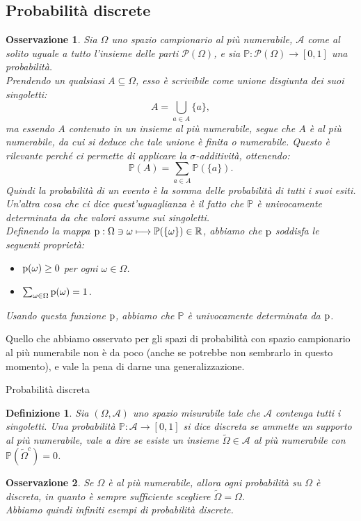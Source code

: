 \documentclass[11pt]{book}
\theoremstyle{Definizione}
\newtheorem*{mydef}{Definizione}
\theoremstyle{TeoremaProposizioneLemmaCorollario}
\theoremstyle{OsservazioneNota}
\newtheorem{myobs}{Osservazione}[section]
\newcommand{\R}{\mathbb{R}}
\newcommand{\parti}[1]{\mathcal{P}\left({#1}\right)}
\renewcommand{\P}{\mathbb{P}}
\newcommand{\p}{\textup{p}}
\begin{document}
\subsection{Probabilità discrete}
\begin{myobs}
Sia $\Omega$ uno spazio campionario al più numerabile, $\mathcal{A}$ come al solito uguale a tutto l'insieme delle parti $\parti{\Omega}$, e sia $\P:\parti{\Omega}\longrightarrow [0,1]$ una probabilità.\\
Prendendo un qualsiasi $A\subseteq \Omega$, esso è scrivibile come unione disgiunta dei suoi singoletti:
$$
A = \bigcup_{a \in A} \{a\},
$$
ma essendo $A$ contenuto in un insieme al più numerabile, segue che $A$ è al più numerabile, da cui si deduce che tale unione è finita o numerabile. Questo è rilevante perché ci permette di applicare la $\sigma$-additività, ottenendo:
$$
\P(A) = \sum_{a\in A} \P(\{a\}).
$$
Quindi la probabilità di un evento è la somma delle probabilità di tutti i suoi esiti.\\
Un'altra cosa che ci dice quest'uguaglianza è il fatto che $\P$ è univocamente determinata da che valori assume sui singoletti.\\
Definendo la mappa $\p:\Omega \ni \omega \longmapsto \P(\{\omega\}) \in \R$, abbiamo che $\p$ soddisfa le seguenti proprietà:
\begin{itemize}
\item[$(i)$] $\p(\omega) \geq 0$ per ogni $\omega\in \Omega$.
\item[$(ii)$] $\sum_{\omega\in \Omega} \p(\omega) = 1$.
\end{itemize}
Usando questa funzione $\p$, abbiamo che $\P$ è univocamente determinata da $\p$.
\end{myobs}
Quello che abbiamo osservato per gli spazi di probabilità con spazio campionario al più numerabile non è da poco (anche se potrebbe non sembrarlo in questo momento), e vale la pena di darne una generalizzazione.
\begin{boxdef}{Probabilità discreta}
\begin{mydef}
Sia $(\Omega,\mathcal{A})$ uno spazio misurabile tale che $\mathcal{A}$ contenga tutti i singoletti. Una probabilità $\P:\mathcal{A}\longrightarrow [0,1]$ si dice discreta se ammette un supporto al più numerabile, vale a dire se esiste un insieme $\widetilde{\Omega}\in \mathcal{A}$ al più numerabile con $\P(\widetilde{\Omega}^c) = 0$.
\end{mydef}
\end{boxdef}
\begin{myobs}
Se $\Omega$ è al più numerabile, allora ogni probabilità su $\Omega$ è discreta, in quanto è sempre sufficiente scegliere $\widetilde{\Omega} = \Omega$.\\
Abbiamo quindi infiniti esempi di probabilità discrete.
\end{myobs}
\end{document}
